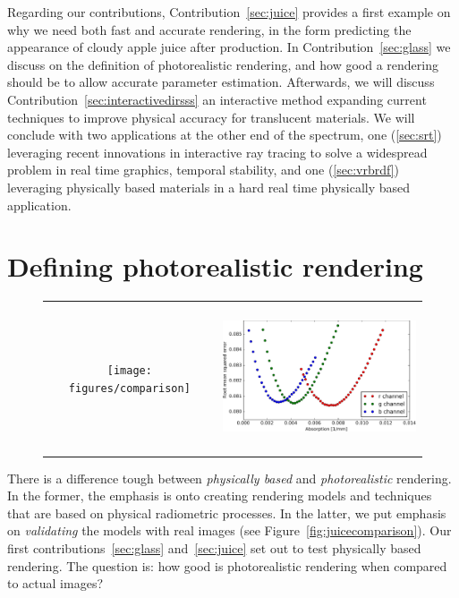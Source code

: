 Regarding our contributions, Contribution~\ref{sec:juice} provides a first example on why we need both fast and accurate rendering, in the form predicting the appearance of  cloudy apple juice after production. In Contribution~\ref{sec:glass} we discuss on the definition of photorealistic rendering, and how good a rendering should be to allow accurate parameter estimation. Afterwards, we will discuss Contribution~\ref{sec:interactivedirsss} an interactive method expanding current techniques to improve physical accuracy for translucent materials. We will conclude with two applications at the other end of the spectrum, one (\ref{sec:srt}) leveraging recent innovations in interactive ray tracing to solve a widespread problem in real time graphics, temporal stability, and one (\ref{sec:vrbrdf}) leveraging physically based materials in a hard real time physically based application. 

\section{Defining photorealistic rendering}
\begin{figure}
\begin{tabular}{@{}c@{}c@{}}
	 \texttt{[image: figures/comparison]} & \hspace{2em}
	 \includegraphics[height=4.3cm]{figures/glass_bowl_analysis_by_synthesis}  \\
\end{tabular}
\caption{} %
\label{fig:glasscomparison}
\end{figure}

There is a difference tough between \emph{physically based} and \emph{photorealistic} rendering. In the former, the emphasis is onto creating rendering models and techniques that are based on physical radiometric processes. In the latter, we put emphasis on \emph{validating} the models with real images (see Figure~\ref{fig:juicecomparison}). Our first contributions~\ref{sec:glass} and~\ref{sec:juice} set out to test physically based rendering. The question is: how good is photorealistic rendering when compared to actual images?

